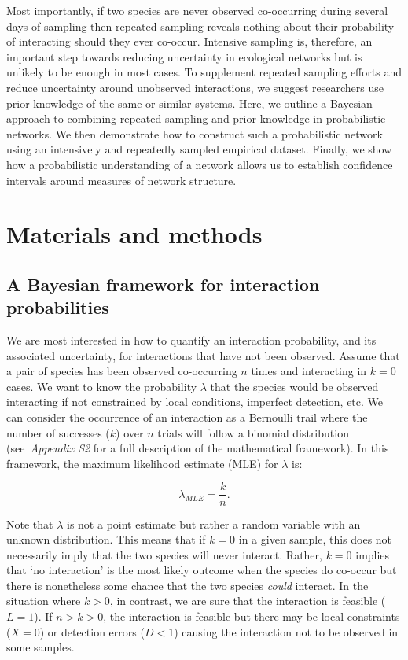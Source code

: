 \documentclass[12pt]{article}
\begin{document}
\begin{spacing}{2.0}
        Most importantly, if two species are never observed co-occurring during several days of sampling then repeated sampling reveals nothing about their probability of interacting should they ever co-occur. Intensive sampling is, therefore, an important step towards reducing uncertainty in ecological networks but is unlikely to be enough in most cases. To supplement repeated sampling efforts and reduce uncertainty around unobserved interactions, we suggest researchers use prior knowledge of the same or similar systems. Here, we outline a Bayesian approach to combining repeated sampling and prior knowledge in probabilistic networks. We then demonstrate how to construct such a probabilistic network using an intensively and repeatedly sampled empirical dataset. Finally, we show how a probabilistic understanding of a network allows us to establish confidence intervals around measures of network structure.


\section*{Materials and methods}

  \subsection*{A Bayesian framework for interaction probabilities}

    We are most interested in how to quantify an interaction probability, and its associated uncertainty, for interactions that have not been observed. Assume that a pair of species has been observed co-occurring $n$ times and interacting in $k = 0$ cases. We want to know the probability $\lambda$ that the species would be observed interacting if not constrained by local conditions, imperfect detection, etc. We can consider the occurrence of an interaction as a Bernoulli trail where the number of successes ($k$) over $n$ trials will follow a binomial distribution (see~\emph{Appendix S2} for a full description of the mathematical framework). In this framework, the maximum likelihood estimate (MLE) for $\lambda$ is:

        \begin{equation}
          \lambda_{MLE} = \frac{k}{n}  .
          \label{theta_MLE}
        \end{equation}
  

    Note that $\lambda$ is not a point estimate but rather a random variable with an unknown distribution. This means that if $k = 0$ in a given sample, this does not necessarily imply that the two species will never interact. Rather, $k = 0$ implies that `no interaction' is the most likely outcome when the species do co-occur but there is nonetheless some chance that the two species \emph{could} interact. In the situation where $k>0$, in contrast, we are sure that the interaction is feasible ($L = 1$). If $n>k>0$, the interaction is feasible but there may be local constraints ($X = 0$) or detection errors ($D<1$) causing the interaction not to be observed in some samples. 



\end{spacing}
\end{document}

